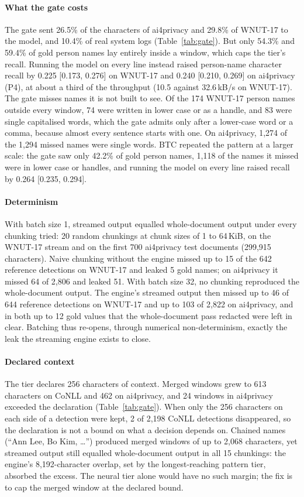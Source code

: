 \documentclass[conference]{IEEEtran}
\begin{document}
\paragraph{What the gate costs} The gate sent 26.5\% of the characters of ai4privacy and 29.8\% of WNUT-17 to the model, and 10.4\% of real system logs (Table~\ref{tab:gate}). But only 54.3\% and 59.4\% of gold person names lay entirely inside a window, which caps the tier's recall. Running the model on every line instead raised person-name character recall by 0.225 [0.173, 0.276] on WNUT-17 and 0.240 [0.210, 0.269] on ai4privacy (P4), at about a third of the throughput (10.5 against 32.6\,kB/s on WNUT-17). The gate misses names it is not built to see. Of the 174 WNUT-17 person names outside every window, 74 were written in lower case or as a handle, and 83 were single capitalised words, which the gate admits only after a lower-case word or a comma, because almost every sentence starts with one. On ai4privacy, 1,274 of the 1,294 missed names were single words. BTC repeated the pattern at a larger scale: the gate saw only 42.2\% of gold person names, 1,118 of the names it missed were in lower case or handles, and running the model on every line raised recall by 0.264 [0.235, 0.294].

\paragraph{Determinism} With batch size 1, streamed output equalled whole-document output under every chunking tried: 20 random chunkings at chunk sizes of 1 to 64\,KiB, on the WNUT-17 stream and on the first 700 ai4privacy test documents (299,915 characters). Naive chunking without the engine missed up to 15 of the 642 reference detections on WNUT-17 and leaked 5 gold names; on ai4privacy it missed 64 of 2,806 and leaked 51. With batch size 32, no chunking reproduced the whole-document output. The engine's streamed output then missed up to 46 of 644 reference detections on WNUT-17 and up to 103 of 2,822 on ai4privacy, and in both up to 12 gold values that the whole-document pass redacted were left in clear. Batching thus re-opens, through numerical non-determinism, exactly the leak the streaming engine exists to close.

\paragraph{Declared context} The tier declares 256 characters of context. Merged windows grew to 613 characters on CoNLL and 462 on ai4privacy, and 24 windows in ai4privacy exceeded the declaration (Table~\ref{tab:gate}). When only the 256 characters on each side of a detection were kept, 2 of 2,198 CoNLL detections disappeared, so the declaration is not a bound on what a decision depends on. Chained names (``Ann Lee, Bo Kim, \dots'') produced merged windows of up to 2,068 characters, yet streamed output still equalled whole-document output in all 15 chunkings: the engine's 8,192-character overlap, set by the longest-reaching pattern tier, absorbed the excess. The neural tier alone would have no such margin; the fix is to cap the merged window at the declared bound.
\end{document}
